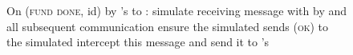 \begin{figure}[H]
\begin{simulatorbox}{\simulator}
\begin{algorithmic}[1]
      \State On (\textsc{fund done}, id) by \fchan's \alice to \charlie:
      \Indent
        \State simulate receiving message with \charlie by \alice and all
        subsequent communication
        \State ensure the simulated \charlie sends (\textsc{ok}) to the
        simulated \alice
        \State intercept this message and send it to \fchan's \alice
      \EndIndent
    \end{algorithmic}
  \end{simulatorbox}
  \caption{}
  \label{code:simulator}
\end{figure}
